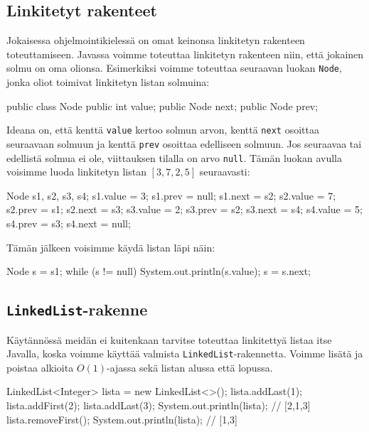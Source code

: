 \subsection{Linkitetyt rakenteet}

Jokaisessa ohjelmointikielessä on omat keinonsa
linkitetyn rakenteen toteuttamiseen.
Javassa voimme toteuttaa linkitetyn rakenteen niin,
että jokainen solmu on oma olionsa.
Esimerkiksi voimme toteuttaa seuraavan luokan \texttt{Node},
jonka oliot toimivat linkitetyn listan solmuina:

\begin{code}
public class Node {
    public int value;
    public Node next;
    public Node prev;
}
\end{code}

Ideana on, että kenttä \texttt{value} kertoo solmun arvon,
kenttä \texttt{next} osoittaa seuraavaan solmuun
ja kenttä \texttt{prev} osoittaa edelliseen solmuun.
Jos seuraavaa tai edellistä solmua ei ole,
viittauksen tilalla on arvo \texttt{null}.
Tämän luokan avulla voisimme luoda linkitetyn listan $[3,7,2,5]$
seuraavasti:

\begin{code}
Node s1, s2, s3, s4;
s1.value = 3; s1.prev = null; s1.next = s2;
s2.value = 7; s2.prev = s1; s2.next = s3;
s3.value = 2; s3.prev = s2; s3.next = s4;
s4.value = 5; s4.prev = s3; s4.next = null;
\end{code}

Tämän jälkeen voisimme käydä listan läpi näin:

\begin{code}
Node s = s1;
while (s != null) {
    System.out.println(s.value);
    s = s.next;
}
\end{code}

\subsection{\texttt{LinkedList}-rakenne}

Käytännössä meidän ei kuitenkaan tarvitse toteuttaa
linkitettyä listaa itse Javalla,
koska voimme käyttää valmista \texttt{LinkedList}-rakennetta.
Voimme lisätä ja poistaa alkioita $O(1)$-ajassa
sekä listan alussa että lopussa.

\begin{code}
LinkedList<Integer> lista = new LinkedList<>();
lista.addLast(1);
lista.addFirst(2);
lista.addLast(3);
System.out.println(lista); // [2,1,3]
lista.removeFirst();
System.out.println(lista); // [1,3]
\end{code}


